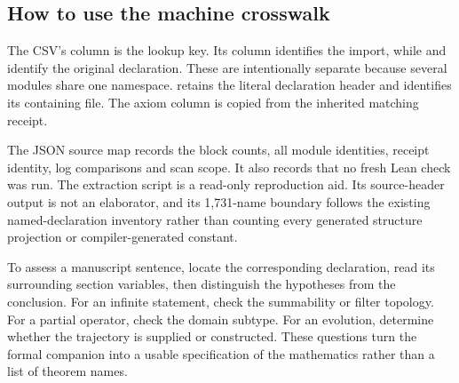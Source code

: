 \subsection{How to use the machine crosswalk}

The CSV's  column is the lookup key. Its  column identifies the import, while  and  identify the original declaration. These are intentionally separate because several modules share one namespace.  retains the literal declaration header and  identifies its containing file. The axiom column is copied from the inherited matching receipt.

The JSON source map records the block counts, all module identities, receipt identity, log comparisons and scan scope. It also records that no fresh Lean check was run. The extraction script is a read-only reproduction aid. Its source-header output is not an elaborator, and its 1,731-name boundary follows the existing named-declaration inventory rather than counting every generated structure projection or compiler-generated constant.

To assess a manuscript sentence, locate the corresponding declaration, read its surrounding section variables, then distinguish the hypotheses from the conclusion. For an infinite statement, check the summability or filter topology. For a partial operator, check the domain subtype. For an evolution, determine whether the trajectory is supplied or constructed. These questions turn the formal companion into a usable specification of the mathematics rather than a list of theorem names.
